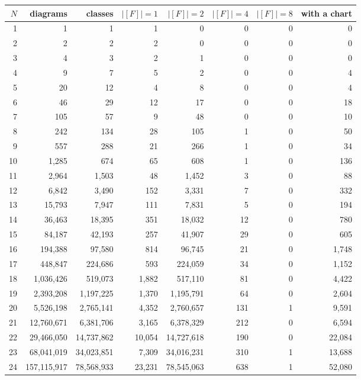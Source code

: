 \documentclass[11pt,a4paper]{amsart}
\numberwithin{equation}{section}
\theoremstyle{plain}
\theoremstyle{definition}
\begin{document}
\begin{table}[ht]
\centering
\footnotesize
\setlength{\tabcolsep}{4pt}
\begin{tabular}{rrrrrrrr}
\toprule
\(N\) & diagrams & classes & \(|[F]|=1\) & \(|[F]|=2\) & \(|[F]|=4\) & \(|[F]|=8\) & with a chart\\
\midrule
1 & 1 & 1 & 1 & 0 & 0 & 0 & 0 \\
2 & 2 & 2 & 2 & 0 & 0 & 0 & 0 \\
3 & 4 & 3 & 2 & 1 & 0 & 0 & 0 \\
4 & 9 & 7 & 5 & 2 & 0 & 0 & 4 \\
5 & 20 & 12 & 4 & 8 & 0 & 0 & 4 \\
6 & 46 & 29 & 12 & 17 & 0 & 0 & 18 \\
7 & 105 & 57 & 9 & 48 & 0 & 0 & 10 \\
8 & 242 & 134 & 28 & 105 & 1 & 0 & 50 \\
9 & 557 & 288 & 21 & 266 & 1 & 0 & 34 \\
10 & 1{,}285 & 674 & 65 & 608 & 1 & 0 & 136 \\
11 & 2{,}964 & 1{,}503 & 48 & 1{,}452 & 3 & 0 & 88 \\
12 & 6{,}842 & 3{,}490 & 152 & 3{,}331 & 7 & 0 & 332 \\
13 & 15{,}793 & 7{,}947 & 111 & 7{,}831 & 5 & 0 & 194 \\
14 & 36{,}463 & 18{,}395 & 351 & 18{,}032 & 12 & 0 & 780 \\
15 & 84{,}187 & 42{,}193 & 257 & 41{,}907 & 29 & 0 & 605 \\
16 & 194{,}388 & 97{,}580 & 814 & 96{,}745 & 21 & 0 & 1{,}748 \\
17 & 448{,}847 & 224{,}686 & 593 & 224{,}059 & 34 & 0 & 1{,}152 \\
18 & 1{,}036{,}426 & 519{,}073 & 1{,}882 & 517{,}110 & 81 & 0 & 4{,}422 \\
19 & 2{,}393{,}208 & 1{,}197{,}225 & 1{,}370 & 1{,}195{,}791 & 64 & 0 & 2{,}604 \\
20 & 5{,}526{,}198 & 2{,}765{,}141 & 4{,}352 & 2{,}760{,}657 & 131 & 1 & 9{,}591 \\
21 & 12{,}760{,}671 & 6{,}381{,}706 & 3{,}165 & 6{,}378{,}329 & 212 & 0 & 6{,}594 \\
22 & 29{,}466{,}050 & 14{,}737{,}862 & 10{,}054 & 14{,}727{,}618 & 190 & 0 & 22{,}084 \\
23 & 68{,}041{,}019 & 34{,}023{,}851 & 7{,}309 & 34{,}016{,}231 & 310 & 1 & 13{,}688 \\
24 & 157{,}115{,}917 & 78{,}568{,}933 & 23{,}231 & 78{,}545{,}063 & 638 & 1 & 52{,}080 \\

\end{tabular}
\end{table}
\end{document}
